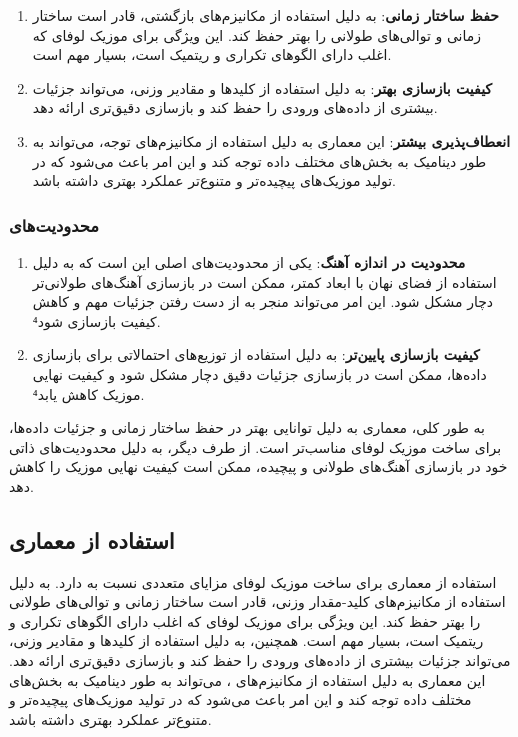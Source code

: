 \begin{enumerate}
  \def\labelenumi{\arabic{enumi}.}
  \item
        \textbf{حفظ ساختار زمانی}:  به دلیل استفاده از مکانیزم‌های بازگشتی،
        قادر است ساختار زمانی و توالی‌های طولانی را بهتر حفظ کند. این ویژگی
        برای موزیک لوفای که اغلب دارای الگوهای تکراری و ریتمیک است، بسیار مهم
        است.
  \item
        \textbf{کیفیت بازسازی بهتر}:  به دلیل استفاده از کلیدها و مقادیر
        وزنی، می‌تواند جزئیات بیشتری از داده‌های ورودی را حفظ کند و بازسازی
        دقیق‌تری ارائه دهد.
  \item
        \textbf{انعطاف‌پذیری بیشتر}: این معماری به دلیل استفاده از مکانیزم‌های
        توجه، می‌تواند به طور دینامیک به بخش‌های مختلف داده توجه کند و این امر
        باعث می‌شود که در تولید موزیک‌های پیچیده‌تر و متنوع‌تر عملکرد بهتری داشته
        باشد.
\end{enumerate}

\subsubsection{محدودیت‌های
  }

\begin{enumerate}
  \def\labelenumi{\arabic{enumi}.}
  \item
        \textbf{محدودیت در اندازه آهنگ}: یکی از محدودیت‌های اصلی  این است که
        به دلیل استفاده از فضای نهان با ابعاد کمتر، ممکن است در بازسازی
        آهنگ‌های طولانی‌تر دچار مشکل شود. این امر می‌تواند منجر به از دست رفتن
        جزئیات مهم و کاهش کیفیت بازسازی شود⁴.
  \item
        \textbf{کیفیت بازسازی پایین‌تر}:  به دلیل استفاده از توزیع‌های
        احتمالاتی برای بازسازی داده‌ها، ممکن است در بازسازی جزئیات دقیق دچار
        مشکل شود و کیفیت نهایی موزیک کاهش یابد⁴.
\end{enumerate}
به طور کلی، معماری  به دلیل توانایی بهتر در حفظ ساختار زمانی و
جزئیات داده‌ها، برای ساخت موزیک لوفای مناسب‌تر است. از طرف دیگر،  به
دلیل محدودیت‌های ذاتی خود در بازسازی آهنگ‌های طولانی و پیچیده، ممکن است
کیفیت نهایی موزیک را کاهش دهد.

\subsection{استفاده از معماری }

استفاده از معماری  برای ساخت موزیک لوفای مزایای متعددی نسبت به   دارد.  به دلیل استفاده از مکانیزم‌های کلید-مقدار وزنی، قادر است ساختار زمانی و توالی‌های طولانی را بهتر حفظ کند. این ویژگی برای موزیک لوفای که اغلب دارای الگوهای تکراری و ریتمیک است، بسیار مهم است. همچنین،  به دلیل استفاده از کلیدها و مقادیر وزنی، می‌تواند جزئیات بیشتری از داده‌های ورودی را حفظ کند و بازسازی دقیق‌تری ارائه دهد. این معماری به دلیل استفاده از مکانیزم‌های ، می‌تواند به طور دینامیک به بخش‌های مختلف داده توجه کند و این امر باعث می‌شود که در تولید موزیک‌های پیچیده‌تر و متنوع‌تر عملکرد بهتری داشته باشد.

